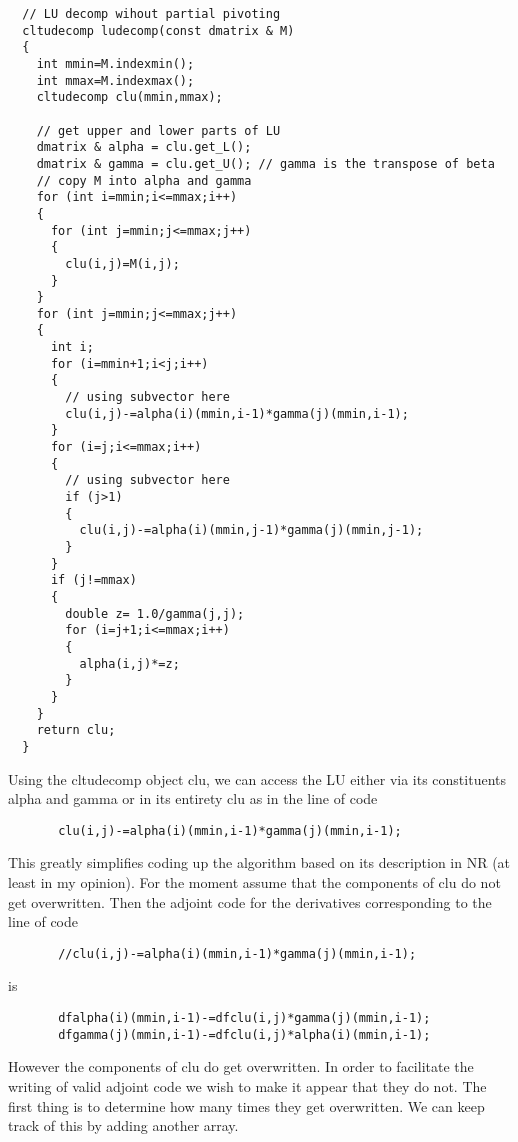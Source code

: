 \documentclass[12pt,letterpaper]{report}
\begin{document}
\begin{verbatim}
  // LU decomp wihout partial pivoting
  cltudecomp ludecomp(const dmatrix & M)
  {
    int mmin=M.indexmin();
    int mmax=M.indexmax();
    cltudecomp clu(mmin,mmax);
 
    // get upper and lower parts of LU
    dmatrix & alpha = clu.get_L();
    dmatrix & gamma = clu.get_U(); // gamma is the transpose of beta
    // copy M into alpha and gamma
    for (int i=mmin;i<=mmax;i++)
    {
      for (int j=mmin;j<=mmax;j++)
      {
        clu(i,j)=M(i,j);
      }
    }
    for (int j=mmin;j<=mmax;j++)
    {
      int i;
      for (i=mmin+1;i<j;i++)
      {
        // using subvector here
        clu(i,j)-=alpha(i)(mmin,i-1)*gamma(j)(mmin,i-1);
      }
      for (i=j;i<=mmax;i++)
      {
        // using subvector here
        if (j>1)
        {
          clu(i,j)-=alpha(i)(mmin,j-1)*gamma(j)(mmin,j-1);
        }
      }
      if (j!=mmax)
      {
        double z= 1.0/gamma(j,j);
        for (i=j+1;i<=mmax;i++)
        {
          alpha(i,j)*=z;
        }
      }
    }
    return clu;
  }
\end{verbatim}
   

 Using the  cltudecomp object clu, we can access the LU either via its
 constituents alpha and gamma or in its entirety clu as in the line of code

\begin{verbatim}
       clu(i,j)-=alpha(i)(mmin,i-1)*gamma(j)(mmin,i-1);
\end{verbatim}
 
This greatly simplifies coding up the algorithm based on its description 
in NR  (at least in my opinion). 
For the moment assume that the components of clu do not get overwritten.
Then the adjoint code for the derivatives corresponding to the line of 
code

\begin{verbatim}
       //clu(i,j)-=alpha(i)(mmin,i-1)*gamma(j)(mmin,i-1);
\end{verbatim}

is
\begin{verbatim}
       dfalpha(i)(mmin,i-1)-=dfclu(i,j)*gamma(j)(mmin,i-1);
       dfgamma(j)(mmin,i-1)-=dfclu(i,j)*alpha(i)(mmin,i-1);
\end{verbatim}

However the components of clu do get overwritten. In order to facilitate
the writing of valid adjoint code we wish to make it appear that they
do not. The first thing is to determine how many times they get overwritten.
We can keep track of this by adding another array.
\end{document}
